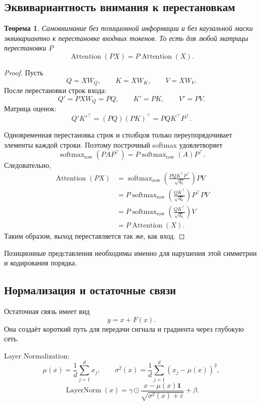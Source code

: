 \documentclass[12pt,a4paper]{article}
\DeclareMathOperator{\softmax}{softmax}
\newcommand{\1}{\mathbf{1}}
\newtheorem{theorem}{Теорема}[section]
\theoremstyle{definition}
\theoremstyle{remark}
\begin{document}
\subsection{Эквивариантность внимания к перестановкам}

\begin{theorem}
Самовнимание без позиционной информации и без каузальной маски
эквивариантно к перестановке входных токенов. То есть для любой матрицы
перестановки $P$
\[
\operatorname{Attention}(PX)=
P\operatorname{Attention}(X).
\]
\end{theorem}

\begin{proof}
Пусть
\[
Q=XW_Q,\qquad K=XW_K,\qquad V=XW_V.
\]
После перестановки строк входа:
\[
Q'=PXW_Q=PQ,\qquad
K'=PK,\qquad
V'=PV.
\]
Матрица оценок:
\[
Q'K'^\top
=
(PQ)(PK)^\top
=
PQK^\top P^\top.
\]

Одновременная перестановка строк и столбцов только переупорядочивает
элементы каждой строки. Поэтому построчный softmax удовлетворяет
\[
\softmax_{\mathrm{row}}(PAP^\top)
=
P\softmax_{\mathrm{row}}(A)P^\top.
\]
Следовательно,
\begin{align*}
\operatorname{Attention}(PX)
&=
\softmax_{\mathrm{row}}
\left(
\frac{PQK^\top P^\top}{\sqrt{d_k}}
\right)PV
\\
&=
P\softmax_{\mathrm{row}}
\left(
\frac{QK^\top}{\sqrt{d_k}}
\right)P^\top PV
\\
&=
P\softmax_{\mathrm{row}}
\left(
\frac{QK^\top}{\sqrt{d_k}}
\right)V
\\
&=
P\operatorname{Attention}(X).
\end{align*}
Таким образом, выход переставляется так же, как вход.
\end{proof}

Позиционные представления необходимы именно для нарушения этой симметрии
и кодирования порядка.

\subsection{Нормализация и остаточные связи}

Остаточная связь имеет вид
\[
y=x+F(x).
\]
Она создаёт короткий путь для передачи сигнала и градиента через
глубокую сеть.

Layer Normalization:
\[
\mu(x)=\frac{1}{d}\sum_{j=1}^{d}x_j,
\qquad
\sigma^2(x)=\frac{1}{d}\sum_{j=1}^{d}(x_j-\mu(x))^2,
\]
\[
\operatorname{LayerNorm}(x)
=
\gamma\odot
\frac{x-\mu(x)\1}{\sqrt{\sigma^2(x)+\varepsilon}}
+\beta.
\]
\end{document}
